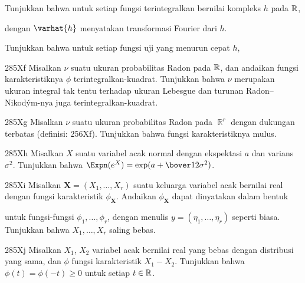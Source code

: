 { Tunjukkan bahwa untuk setiap fungsi terintegralkan bernilai kompleks
$h$ pada $\Bbb R$,


\noindent dengan $\varhat{h}$ menyatakan transformasi Fourier dari $h$.

 Tunjukkan bahwa untuk setiap fungsi uji yang menurun cepat $h$,


\spheader 285Xf Misalkan $\nu$ suatu ukuran probabilitas Radon pada
$\Bbb R$, dan andaikan fungsi karakteristiknya $\phi$ terintegralkan-kuadrat.
Tunjukkan bahwa $\nu$ merupakan ukuran integral tak tentu terhadap ukuran
Lebesgue dan turunan Radon--Nikod\'ym-nya juga terintegralkan-kuadrat.

\spheader 285Xg Misalkan $\nu$ suatu ukuran probabilitas
Radon pada $\BbbR^r$ dengan dukungan terbatas (definisi: 256Xf). Tunjukkan bahwa
fungsi karakteristiknya mulus.

\spheader 285Xh Misalkan $X$ suatu variabel acak normal dengan ekspektasi $a$
dan varians $\sigma^2$. Tunjukkan bahwa
$\Expn(e^X)=\exp(a+\bover12\sigma^2)$.

\sqheader 285Xi Misalkan $\pmb{X}=(X_1,\ldots,X_r)$ suatu keluarga variabel
acak bernilai real dengan fungsi karakteristik $\phi_{\pmb{X}}$. Andaikan
$\phi_{\pmb{X}}$ dapat dinyatakan dalam bentuk


\noindent untuk fungsi-fungsi $\phi_1,\ldots,\phi_r$, dengan menulis
$y=(\eta_1,\ldots,\eta_r)$ seperti biasa. Tunjukkan bahwa $X_1,\ldots,X_r$
saling bebas. 

\spheader 285Xj Misalkan $X_1$, $X_2$ variabel acak bernilai real yang bebas
dengan distribusi yang sama, dan $\phi$ fungsi karakteristik $X_1-X_2$.
Tunjukkan bahwa $\phi(t)=\phi(-t)\ge 0$ untuk setiap
$t\in\Bbb R$.

}
